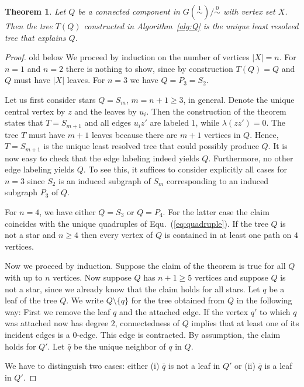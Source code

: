 \documentclass[smallextended]{svjour3}
\newcommand{\remove}[1]{\begingroup\color{magenta}#1\endgroup}
\newcommand{\Ro}{\mathrel{\overset{0}{\sim}}}
\newcommand{\Rl}{\mathrel{\overset{1}{\sim}}}
\newtheorem{thm}{Theorem}
\begin{document}
\begin{thm}
  Let $Q$ be a connected component in $G(\Rl)/\Ro$ with vertex set $X$.
  Then the tree $T(Q)$ constructed in Algorithm~\ref{alg:Q} is the unique
  least resolved tree that explains $Q$.
  \label{thm:connComp}
\end{thm}
\begin{proof}
	


	
  \remove{old below}
  We proceed by induction on the number of vertices $|X|=n$.  For $n=1$ and
  $n=2$ there is nothing to show, since by construction $T(Q)=Q$ and $Q$
  must have $|X|$ leaves.  For $n=3$ we have $Q=P_3=S_2$.

  Let us first consider stars $Q=S_m$, $m=n+1\ge 3$, in general. Denote the
  unique central vertex by $z$ and the leaves by $u_i$. Then the
  construction of the theorem states that $T=S_{m+1}$ and all edges $u_iz'$
  are labeled $1$, while $\lambda(zz')=0$. The tree $T$ must have $m+1$
  leaves because there are $m+1$ vertices in $Q$. Hence, $T=S_{m+1}$ is the
  unique least resolved tree that could possibly produce $Q$. It is now
  easy to check that the edge labeling indeed yields $Q$. Furthermore, no
  other edge labeling yields $Q$. To see this, it suffices to consider
  explicitly all cases for $n=3$ since $S_2$ is an induced subgraph of
  $S_m$ corresponding to an induced subgraph $P_3$ of $Q$.

  For $n=4$, we have either $Q=S_3$ or $Q=P_4$. For the latter case the
  claim coincides with the unique quadruples of Equ.~(\ref{eq:quadruple}).
  If the tree $Q$ is not a star and $n\ge 4$ then every vertex of $Q$ is
  contained in at least one path on $4$ vertices.

  Now we proceed by induction. Suppose the claim of the theorem is true for
  all $Q$ with up to $n$ vertices. Now suppose $Q$ has $n+1\ge 5$ vertices
  and suppose $Q$ is not a star, since we already know that the claim holds
  for all stars. Let $q$ be a leaf of the tree $Q$. We write
  $Q\setminus\{q\}$ for the tree obtained from $Q$ in the following way:
  First we remove the leaf $q$ and the attached edge. If the vertex $q'$ to
  which $q$ was attached now has degree $2$, connectedness of $Q$ implies
  that at least one of its incident edges is a 0-edge. This edge is
  contracted.  By assumption, the claim holds for $Q'$. Let $\bar q$ be the
  unique neighbor of $q$ in $Q$.
 
  We have to distinguish two cases: either (i) $\bar q$ is not a leaf in
  $Q'$ or (ii) $\bar q$ is a leaf in $Q'$.


\end{proof}
\end{document}
